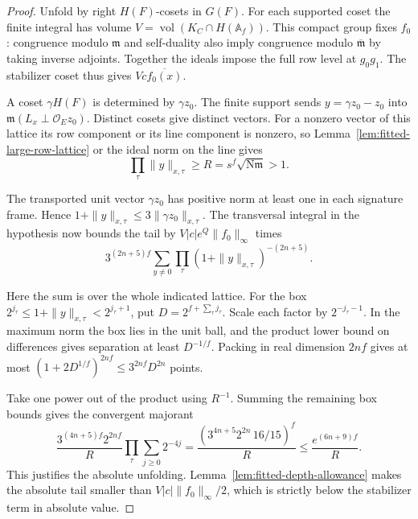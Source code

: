 \begin{proof}
Unfold by right \(H(F)\)-cosets in \(G(F)\). For each supported coset the
finite integral has volume \(V=\operatorname{vol}(K_C\cap H(\mathbb A_f))\).
This compact group fixes \(f_0\): congruence modulo \(\mathfrak m\) and
self-duality also imply congruence modulo \(\overline{\mathfrak m}\)
by taking inverse adjoints. Together the ideals impose the full row
level at \(g_0g_1\). The stabilizer coset thus gives \(V c\overline{f_0(x)}\).

A coset \(\gamma H(F)\) is determined by \(\gamma z_0\). The finite
support sends \(y=\gamma z_0-z_0\) into
\(\mathfrak m(L_x\perp\mathcal O_Ez_0)\). Distinct cosets give distinct
vectors. For a nonzero vector of this lattice its row component or its
line component is nonzero, so Lemma~\ref{lem:fitted-large-row-lattice}
or the ideal norm on the line gives
\[
    \prod_\tau\|y\|_{x,\tau}\ge R=s^f\sqrt{\mathrm N\mathfrak m}>1 .
\]

The transported unit vector \(\gamma z_0\) has positive norm at least
one in each signature frame. Hence
\(1+\|y\|_{x,\tau}\le3\|\gamma z_0\|_{x,\tau}\).
The transversal integral in the hypothesis now bounds the tail by
\(V |c|e^Q\|f_0\|_\infty\) times
\[
     3^{(2n+5)f}\sum_{y\ne0}\prod_\tau(1+\|y\|_{x,\tau})^{-(2n+5)} .
\]

Here the sum is over the whole indicated lattice. For the box
\(2^{j_\tau}\le1+\|y\|_{x,\tau}<2^{j_\tau+1}\), put
\(D=2^{f+\sum_\tau j_\tau}\). Scale each factor by
\(2^{-j_\tau-1}\). In the maximum norm the box lies in the unit ball,
and the product lower bound on differences gives separation at least
\(D^{-1/f}\). Packing in real dimension \(2nf\) gives at most
\((1+2D^{1/f})^{2nf}\le3^{2nf}D^{2n}\) points.

Take one power out of the product using \(R^{-1}\). Summing the
remaining box bounds gives the convergent majorant
\[
 \frac{3^{(4n+5)f}2^{2nf}}{R}
     \prod_\tau\sum_{j\ge0}2^{-4j}
 =\frac{(3^{4n+5}2^{2n}\,16/15)^f}{R}
 \le\frac{e^{(6n+9)f}}{R} .
\]
This justifies the absolute unfolding. Lemma~\ref{lem:fitted-depth-allowance}
makes the absolute tail smaller than \(V|c|\|f_0\|_\infty/2\), which is
strictly below the stabilizer term in absolute value.
\end{proof}

